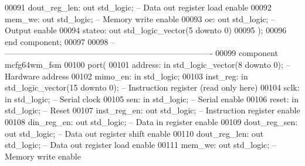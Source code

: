\begin{DoxyCode}
00091         dout\_reg\_len: \textcolor{keywordflow}{out} \textcolor{comment}{std\_logic};            \textcolor{keyword}{-- Data out register load enable}
00092         mem\_we: \textcolor{keywordflow}{out} \textcolor{comment}{std\_logic};              \textcolor{keyword}{-- Memory write enable}
00093         oe: \textcolor{keywordflow}{out} \textcolor{comment}{std\_logic};              \textcolor{keyword}{-- Output enable}
00094         stateo: \textcolor{keywordflow}{out} \textcolor{comment}{std\_logic\_vector}(\textcolor{vhdllogic}{}\textcolor{vhdllogic}{5} \textcolor{keywordflow}{downto} \textcolor{vhdllogic}{}\textcolor{vhdllogic}{0})
00095     );
00096 \textcolor{keywordflow}{end} \textcolor{keywordflow}{component};
00097 
00098 \textcolor{keyword}{-- ----------------------------------------------------------------------------}
00099 \textcolor{keywordflow}{component} mcfg64wm\_fsm
00100     \textcolor{keywordflow}{port}(
00101         address: \textcolor{keywordflow}{in} \textcolor{comment}{std\_logic\_vector}(\textcolor{vhdllogic}{}\textcolor{vhdllogic}{8} \textcolor{keywordflow}{downto} \textcolor{vhdllogic}{}\textcolor{vhdllogic}{0});   \textcolor{keyword}{-- Hardware address}
00102         mimo\_en: \textcolor{keywordflow}{in} \textcolor{comment}{std\_logic};
00103         inst\_reg: \textcolor{keywordflow}{in} \textcolor{comment}{std\_logic\_vector}(\textcolor{vhdllogic}{}\textcolor{vhdllogic}{15} \textcolor{keywordflow}{downto} \textcolor{vhdllogic}{}\textcolor{vhdllogic}{0}); \textcolor{keyword}{-- Instruction register (read only here)}
00104         sclk: \textcolor{keywordflow}{in} \textcolor{comment}{std\_logic};             \textcolor{keyword}{-- Serial clock}
00105         sen: \textcolor{keywordflow}{in} \textcolor{comment}{std\_logic};              \textcolor{keyword}{-- Serial enable}
00106         reset: \textcolor{keywordflow}{in} \textcolor{comment}{std\_logic};                \textcolor{keyword}{-- Reset}
00107         inst\_reg\_en: \textcolor{keywordflow}{out} \textcolor{comment}{std\_logic};         \textcolor{keyword}{-- Instruction register enable}
00108         din\_reg\_en: \textcolor{keywordflow}{out} \textcolor{comment}{std\_logic};          \textcolor{keyword}{-- Data in register enable}
00109         dout\_reg\_sen: \textcolor{keywordflow}{out} \textcolor{comment}{std\_logic};            \textcolor{keyword}{-- Data out register shift enable}
00110         dout\_reg\_len: \textcolor{keywordflow}{out} \textcolor{comment}{std\_logic};            \textcolor{keyword}{-- Data out register load enable}
00111         mem\_we: \textcolor{keywordflow}{out} \textcolor{comment}{std\_logic};              \textcolor{keyword}{-- Memory write enable}

\end{DoxyCode}
